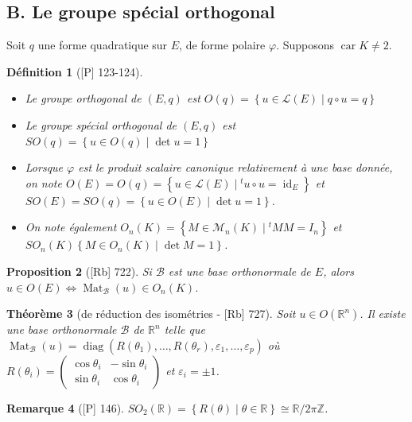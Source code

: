 \documentclass[10pt, a4paper, parskip=full, twoside, twocolumn]{report}
\newtheorem{definition}{Définition}
\newtheorem{theorem}[definition]{Théorème}
\newtheorem{proposition}[definition]{Proposition}
\newtheorem{remark}[definition]{Remarque}
\newcommand{\IZ}{\mathbb{Z}}
\newcommand{\IR}{\mathbb{R}}
\newcommand{\IRn}{\mathbb{R}^n}
\DeclareMathOperator{\Mat}{Mat}
\DeclareMathOperator{\id}{id}
\DeclareMathOperator{\diag}{diag}
\DeclareMathOperator{\car}{car}
\begin{document}
\subsection*{B. Le groupe spécial orthogonal}
Soit $q$ une forme quadratique sur $E$, de forme polaire $\varphi$. Supposons $\car K \neq 2$.

\begin{definition}[\textnormal{[P] 123-124}]
	\begin{itemize}
		\item Le \emph{groupe orthogonal} de $(E,q)$ est $O(q) = \left\{u\in\mathcal{L}(E)\mid q\circ u = q\right\}$
		\item Le \emph{groupe spécial orthogonal} de $(E,q)$ est $SO(q) = \left\{u\in O(q)\mid \det u = 1\right\}$
		\item Lorsque $\varphi$ est le produit scalaire canonique relativement à une base donnée, on note $O(E)=O(q)=\left\{u\in\mathcal{L}(E)\mid {}^tu\circ u = \id_E\right\}$ et $SO(E)=SO(q)=\left\{u\in O(E)\mid \det u = 1\right\}$.
		\item On note également $O_n(K) = \left\{M\in\mathcal{M}_n(K)\mid {}^tMM=I_n\right\}$ et $SO_n(K)  \left\{M\in O_n(K)\mid \det M = 1\right\}$.
	\end{itemize}
\end{definition}

\begin{proposition}[\textnormal{[Rb] 722}]
	Si $\mathcal{B}$ est une base orthonormale de $E$, alors $u\in O(E)\iff \Mat_{\mathcal{B}}(u)\in O_n(K)$.
\end{proposition}

\begin{theorem}[de réduction des isométries - \textnormal{[Rb] 727}]
	Soit $u\in O(\IRn)$. Il existe une base orthonormale $\mathcal{B}$ de $\IRn$ telle que $\Mat_{\mathcal{B}}(u)=\diag(R(\theta_1),\dots,R(\theta_r),\varepsilon_1,\dots,\varepsilon_p)$
	où $R(\theta_i) = \begin{pmatrix}
		\cos \theta_i & -\sin \theta_i \\
		\sin \theta_i & \cos \theta_i
	\end{pmatrix}$ et $\varepsilon_i = \pm 1$.
\end{theorem}

\begin{remark}[\textnormal{[P] 146}]
	$SO_2(\IR) = \left\{R(\theta)\mid \theta\in\IR\right\}\cong \IR/2\pi\IZ$.
\end{remark}
\end{document}
